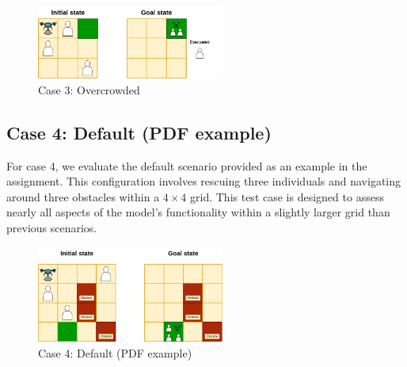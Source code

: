 \documentclass{article}
\begin{document}
\begin{figure}[ht]
    \centering
    \includegraphics[width=0.55\textwidth]{assets/problem-3-overcrowded.drawio.png}
    \caption{Case 3: Overcrowded}
    \label{fig:initial-state-overcrowded}
\end{figure}

\FloatBarrier

\subsection{Case 4: Default (PDF example)}

For case 4, we evaluate the default scenario provided as an example in the assignment. This configuration involves rescuing three individuals and navigating around three obstacles within a \(4 \times 4\) grid. This test case is designed to assess nearly all aspects of the model's functionality within a slightly larger grid than previous scenarios.

\begin{figure}[ht]
    \centering
    \includegraphics[width=0.55\textwidth]{assets/problem-4-pdf-example.drawio.png}
    \caption{Case 4: Default (PDF example)}
    \label{fig:initial-state-default}
\end{figure}

\FloatBarrier
\end{document}

